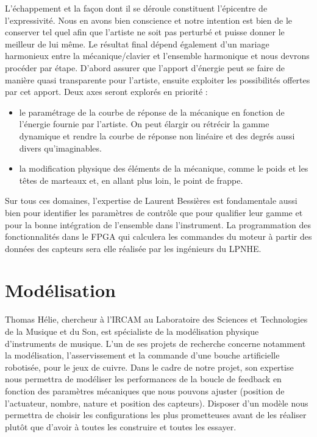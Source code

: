 \documentclass[french,a4paper,12pt]{report}
\begin{document}
L’échappement et la façon dont il se déroule constituent l’épicentre de l’expressivité. Nous en avons bien conscience et notre intention est bien de le conserver tel quel afin que l’artiste ne soit pas perturbé et puisse donner le meilleur de lui même. Le résultat final dépend également d’un mariage harmonieux entre la mécanique/clavier et l’ensemble harmonique et nous devrons procéder par étape. D’abord assurer que l’apport d’énergie peut se faire de manière quasi transparente pour l’artiste, ensuite exploiter les possibilités offertes par cet apport. Deux axes seront explorés en priorité :

\begin{itemize}
\item  le paramétrage de la courbe de réponse de la mécanique en fonction de l’énergie fournie par l’artiste. On peut élargir ou rétrécir la gamme dynamique et rendre la courbe de réponse non linéaire et des degrés aussi divers qu'imaginables.

\item  la modification physique des éléments de la mécanique, comme le poids et les têtes de marteaux et, en allant plus loin, le point de frappe.
\end{itemize}

Sur tous ces domaines, l’expertise de Laurent Bessières est fondamentale aussi bien pour identifier les paramètres de contrôle que pour qualifier leur gamme et pour la bonne intégration de l’ensemble dans l’instrument. La programmation des fonctionnalités dans le FPGA qui calculera les commandes du moteur à partir des données des capteurs sera elle réalisée par les ingénieurs du LPNHE.

\newpage

  \section{Modélisation}

Thomas Hélie, chercheur à l’IRCAM au Laboratoire des Sciences et Technologies de la Musique et du Son, est spécialiste de la modélisation physique d’instruments de musique. L’un de ses projets de recherche concerne notamment la modélisation, l’asservissement et la commande d’une bouche artificielle robotisée, pour le jeux de cuivre. Dans le cadre de notre projet, son expertise nous permettra de modéliser les performances de la boucle de feedback en fonction des paramètres mécaniques que nous pouvons ajuster (position de l’actuateur, nombre, nature et position des capteurs). Disposer d’un modèle nous permettra de choisir les configurations les plus prometteuses avant de les réaliser plutôt que d’avoir à toutes les construire et toutes les essayer.
\end{document}
